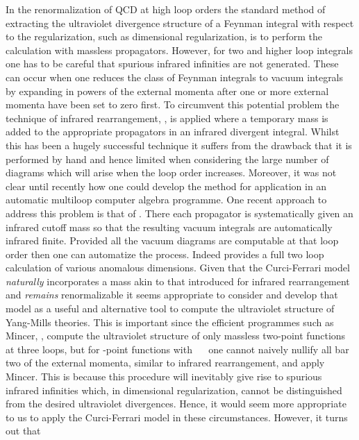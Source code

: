 \documentclass[a4paper,11pt]{article}
\begin{document}
In the renormalization of QCD at high loop orders the standard method of
extracting the ultraviolet divergence structure of a Feynman integral with
respect to the regularization, such as dimensional regularization, is to 
perform the calculation with massless propagators. However, for two and higher 
loop integrals one has to be careful that spurious infrared infinities are not
generated. These can occur when one reduces the class of Feynman integrals to 
vacuum integrals by expanding in powers of the external momenta after one or
more external momenta have been set to zero first. To circumvent this potential 
problem the technique of infrared rearrangement, \cite{15,16}, is applied where
a temporary mass is added to the appropriate propagators in an infrared 
divergent integral. Whilst this has been a hugely successful technique it 
suffers from the drawback that it is performed by hand and hence limited when 
considering the large number of diagrams which will arise when the loop order 
increases. Moreover, it was not clear until recently how one could develop the 
method for application in an automatic multiloop computer algebra programme. 
One recent approach to address this problem is that of \cite{17,18}. There each
propagator is systematically given an infrared cutoff mass so that the 
resulting vacuum integrals are automatically infrared finite. Provided all the 
vacuum diagrams are computable at that loop order then one can automatize the 
process. Indeed \cite{17,18} provides a full two loop calculation of various 
anomalous dimensions. Given that the Curci-Ferrari model {\em naturally} 
incorporates a mass akin to that introduced for infrared rearrangement and 
{\em remains} renormalizable it seems appropriate to consider and develop that 
model as a useful and alternative tool to compute the ultraviolet structure of 
Yang-Mills theories. This is important since the efficient programmes such as 
{\sc Mincer}, \cite{19}, compute the ultraviolet structure of only massless 
two-point functions at three loops, but for \coordHE{}-point functions with 
\coordHE{}~\myHighlight{$>$}\coordHE{}~\coordHE{} one cannot naively nullify all bar two of the external momenta, 
similar to infrared rearrangement, and apply {\sc Mincer}. This is because this
procedure will inevitably give rise to spurious infrared infinities which, in 
dimensional regularization, cannot be distinguished from the desired 
ultraviolet divergences. Hence, it would seem more appropriate to us to apply 
the Curci-Ferrari model in these circumstances. However, it turns out that 
\end{document}
